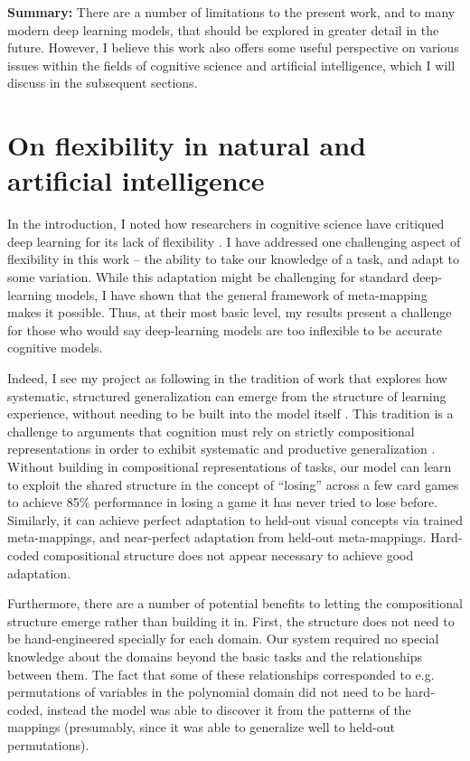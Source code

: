 \textbf{Summary:} There are a number of limitations to the present work, and to many modern deep learning models, that should be explored in greater detail in the future. However, I believe this work also offers some useful perspective on various issues within the fields of cognitive science and artificial intelligence, which I will discuss in the subsequent sections. 


\section{On flexibility in natural and artificial intelligence}

In the introduction, I noted how researchers in cognitive science have critiqued deep learning for its lack of flexibility \citep[e.g.][]{Lake2015, Lake2016, Lake2017, Marcus2018}. I have addressed one challenging aspect of flexibility in this work -- the ability to take our knowledge of a task, and adapt to some variation. While this adaptation might be challenging for standard deep-learning models, I have shown that the general framework of meta-mapping makes it possible. Thus, at their most basic level, my results present a challenge for those who would say deep-learning models are too inflexible to be accurate cognitive models. \par  

Indeed, I see my project as following in the tradition of work that explores how systematic, structured generalization can emerge from the structure of learning experience, without needing to be built into the model itself \citep{McClelland2010a, McClelland2010, Hansen2017}. This tradition is a challenge to arguments that cognition must rely on strictly compositional representations in order to exhibit systematic and productive generalization \citep[e.g.][]{Fodor2001, Fodor2008lot2, Lake2017}. Without building in compositional representations of tasks, our model can learn to exploit the shared structure in the concept of ``losing'' across a few card games to achieve 85\% performance in losing a game it has never tried to lose before. Similarly, it can achieve perfect adaptation to held-out visual concepts via trained meta-mappings, and near-perfect adaptation from held-out meta-mappings. Hard-coded compositional structure does not appear necessary to achieve good adaptation. \par 

Furthermore, there are a number of potential benefits to letting the compositional structure emerge rather than building it in. First, the structure does not need to be hand-engineered specially for each domain. Our system required no special knowledge about the domains beyond the basic tasks and the relationships between them. The fact that some of these relationships corresponded to e.g. permutations of variables in the polynomial domain did not need to be hard-coded, instead the model was able to discover it from the patterns of the mappings (presumably, since it was able to generalize well to held-out permutations). \par


